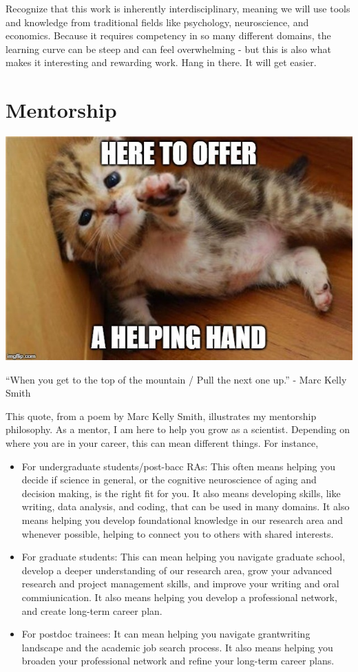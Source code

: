 \documentclass[]{book}
\begin{document}
Recognize that this work is inherently interdisciplinary, meaning we will use tools and knowledge from traditional fields like psychology, neuroscience, and economics. Because it requires competency in so many different domains, the learning curve can be steep and can feel overwhelming - but this is also what makes it interesting and rewarding work. Hang in there. It will get easier.

\hypertarget{mentorship}{%
\section{Mentorship}\label{mentorship}}

\includegraphics{images/help.jpeg}

``When you get to the top of the mountain / Pull the next one up.'' - Marc Kelly Smith

This quote, from a poem by Marc Kelly Smith, illustrates my mentorship philosophy. As a mentor, I am here to help you grow as a scientist. Depending on where you are in your career, this can mean different things. For instance,

\begin{itemize}
\item
  For undergraduate students/post-bacc RAs: This often means helping you decide if science in general, or the cognitive neuroscience of aging and decision making, is the right fit for you. It also means developing skills, like writing, data analysis, and coding, that can be used in many domains. It also means helping you develop foundational knowledge in our research area and whenever possible, helping to connect you to others with shared interests.
\item
  For graduate students: This can mean helping you navigate graduate school, develop a deeper understanding of our research area, grow your advanced research and project management skills, and improve your writing and oral commiunication. It also means helping you develop a professional network, and create long-term career plan.
\item
  For postdoc trainees: It can mean helping you navigate grantwriting landscape and the academic job search process. It also means helping you broaden your professional network and refine your long-term career plans.
\end{itemize}
\end{document}
